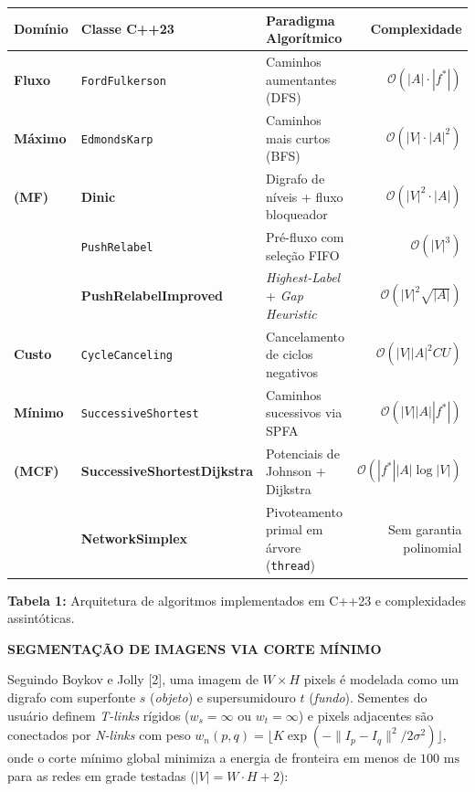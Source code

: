 \documentclass[final]{article}
\newcommand{\destaque}[1]{\textcolor{ufabcgreen}{\textbf{#1}}}
\newcommand{\postersection}[1]{
    \par\vspace{0.55em}
    {\fontsize{34}{40}\selectfont\bfseries\color{textdark}#1}
    \par\vspace{0.2em}
}
\newcommand{\postercaption}[2]{
    \par\vspace{0.22em}
    {\fontsize{25}{30}\selectfont\raggedright\textbf{#1:} #2\par}
    \vspace{0.3em}
}
\begin{document}
\begin{minipage}[t]{41.275cm}
\vspace{0.15em}
{\fontsize{24}{29}\selectfont
\renewcommand{\arraystretch}{1.15}
\setlength{\tabcolsep}{6pt}
\begin{tabular*}{\linewidth}{@{\extracolsep{\fill}}lllr@{}}
\toprule
\textbf{Domínio} & \textbf{Classe C++23} & \textbf{Paradigma Algorítmico} & \textbf{Complexidade} \\
\midrule
\textbf{Fluxo} & \texttt{FordFulkerson} & Caminhos aumentantes (DFS) & $\mathcal{O}(|A| \cdot |f^*|)$ \\
\textbf{Máximo} & \texttt{EdmondsKarp} & Caminhos mais curtos (BFS) & $\mathcal{O}(|V| \cdot |A|^2)$ \\
\textbf{(MF)} & \destaque{Dinic} & Digrafo de níveis + fluxo bloqueador & $\mathcal{O}(|V|^2 \cdot |A|)$ \\
 & \texttt{PushRelabel} & Pré-fluxo com seleção FIFO & $\mathcal{O}(|V|^3)$ \\
 & \destaque{PushRelabelImproved} & \textit{Highest-Label} + \textit{Gap Heuristic} & $\mathcal{O}(|V|^2 \sqrt{|A|})$ \\
\midrule
\textbf{Custo} & \texttt{CycleCanceling} & Cancelamento de ciclos negativos & $\mathcal{O}(|V| |A|^2 C U)$ \\
\textbf{Mínimo} & \texttt{SuccessiveShortest} & Caminhos sucessivos via SPFA & $\mathcal{O}(|V| |A| |f^*|)$ \\
\textbf{(MCF)} & \destaque{SuccessiveShortestDijkstra} & Potenciais de Johnson + Dijkstra & $\mathcal{O}(|f^*| |A| \log |V|)$ \\
 & \destaque{NetworkSimplex} & Pivoteamento primal em árvore (\texttt{thread}) & Sem garantia polinomial \\
\bottomrule
\end{tabular*}
}
\postercaption{Tabela 1}{Arquitetura de algoritmos implementados em C++23 e complexidades assintóticas.}

\postersection{SEGMENTAÇÃO DE IMAGENS VIA CORTE MÍNIMO}
Seguindo Boykov e Jolly [2], uma imagem de $W \times H$ pixels é modelada como um digrafo com superfonte $s$ (\textit{objeto}) e supersumidouro $t$ (\textit{fundo}). Sementes do usuário definem \textit{T-links} rígidos ($w_s = \infty$ ou $w_t = \infty$) e pixels adjacentes são conectados por \textit{N-links} com peso $w_n(p, q) = \lfloor K \exp(-\|I_p - I_q\|^2 / 2\sigma^2) \rfloor$, onde o corte mínimo global minimiza a energia de fronteira em menos de $100\text{ ms}$ para as redes em grade testadas ($|V| = W \cdot H + 2$):


\end{minipage}
\end{document}

